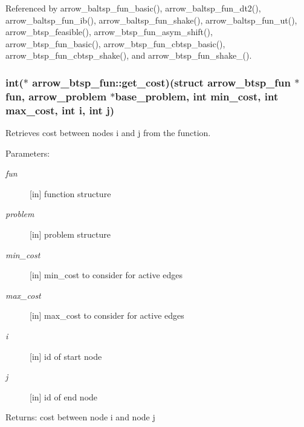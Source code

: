 Referenced by arrow\_\-baltsp\_\-fun\_\-basic(), arrow\_\-baltsp\_\-fun\_\-dt2(), arrow\_\-baltsp\_\-fun\_\-ib(), arrow\_\-baltsp\_\-fun\_\-shake(), arrow\_\-baltsp\_\-fun\_\-ut(), arrow\_\-btsp\_\-feasible(), arrow\_\-btsp\_\-fun\_\-asym\_\-shift(), arrow\_\-btsp\_\-fun\_\-basic(), arrow\_\-btsp\_\-fun\_\-cbtsp\_\-basic(), arrow\_\-btsp\_\-fun\_\-cbtsp\_\-shake(), and arrow\_\-btsp\_\-fun\_\-shake\_().\hypertarget{structarrow__btsp__fun_ffc634f9d1a545f890b0b2007aff544d}{
\subsubsection[{get\_\-cost}]{\setlength{\rightskip}{0pt plus 5cm}int($\ast$ {\bf arrow\_\-btsp\_\-fun::get\_\-cost})(struct {\bf arrow\_\-btsp\_\-fun} $\ast$fun, {\bf arrow\_\-problem} $\ast$base\_\-problem, int min\_\-cost, int max\_\-cost, int i, int j)}}
\label{structarrow__btsp__fun_ffc634f9d1a545f890b0b2007aff544d}


Retrieves cost between nodes i and j from the function. 

\begin{Desc}
\item[Parameters:]
\begin{description}
\item[{\em fun}]\mbox{[}in\mbox{]} function structure \item[{\em problem}]\mbox{[}in\mbox{]} problem structure \item[{\em min\_\-cost}]\mbox{[}in\mbox{]} min\_\-cost to consider for active edges \item[{\em max\_\-cost}]\mbox{[}in\mbox{]} max\_\-cost to consider for active edges \item[{\em i}]\mbox{[}in\mbox{]} id of start node \item[{\em j}]\mbox{[}in\mbox{]} id of end node \end{description}
\end{Desc}
\begin{Desc}
\item[Returns:]cost between node i and node j \end{Desc}



